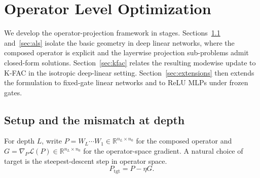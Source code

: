 \documentclass{article}
\newcommand{\R}{\mathbb{R}}
\newcommand{\Ptgt}{P_{\mathrm{tgt}}}
\begin{document}
\section{Operator Level Optimization}
\label{sec:framework}



We develop the operator-projection framework in stages. Sections~\ref{sec:setup}
and~\ref{sec:als} isolate the basic geometry in deep linear networks, where the
composed operator is explicit and the layerwise projection sub-problems admit
closed-form solutions. Section~\ref{sec:kfac} relates the resulting modewise
update to K-FAC in the isotropic deep-linear setting. Section~\ref{sec:extensions}
then extends the formulation to fixed-gate linear networks and to ReLU MLPs
under frozen gates.

\subsection{Setup and the mismatch at depth}
\label{sec:setup}

For depth $L$, write $P = W_L \cdots W_1 \in \R^{n_L \times n_0}$ for the
composed operator and $G = \nabla_P \mathcal{L}(P) \in \R^{n_L \times n_0}$
for the operator-space gradient.
A natural choice of target is the steepest-descent step in operator space.
\begin{equation}
  \Ptgt = P - \eta G.
  \label{eq:operator-target}
\end{equation}

\end{document}
